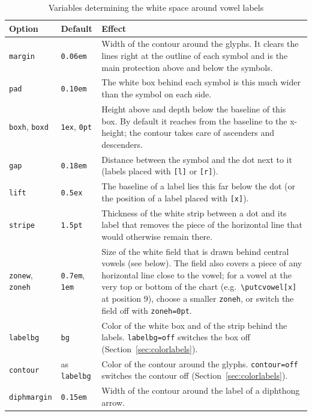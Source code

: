 \documentclass[a4paper,11pt]{article}
\newcommand\cmd[1]{\texttt{\textbackslash #1}}
\newcommand\opt[1]{\texttt{#1}}
\begin{document}
\begin{table}[htbp]
	\begin{center}\small
		\renewcommand\arraystretch{1.2}
		\begin{tabular}{@{}llp{12cm}@{}}
			\toprule
			Option & Default & Effect\\
			\midrule
			\opt{margin}     & \texttt{0.06em} & Width of the contour around the glyphs. It clears the lines
			right at the outline of each symbol and is the main protection above and below
			the symbols.\\
			\opt{pad}        & \texttt{0.10em} & The white box behind each symbol is this much wider than the
			symbol on each side.\\
			\opt{boxh}, \opt{boxd} & \texttt{1ex}, \texttt{0pt} & Height above and depth below the baseline of this
			box. By default it reaches from the baseline to the x-height; the contour
			takes care of ascenders and descenders.\\
			\opt{gap}        & \texttt{0.18em} & Distance between the symbol and the dot next to it
			(labels placed with \texttt{[l]} or \texttt{[r]}).\\
			\opt{lift}       & \texttt{0.5ex}   & The baseline of a label lies this far below the dot (or the
			position of a label placed with \texttt{[x]}).\\
			\opt{stripe}     & \texttt{1.5pt}  & Thickness of the white strip between a dot and its label that removes the piece of the horizontal line that would otherwise remain there.\\
			\opt{zonew}, \opt{zoneh} & \texttt{0.7em}, \texttt{1em} & Size of the white field that is drawn behind central vowels
			(see below). The field also covers a piece of any horizontal line close to the vowel; for a vowel at the very top or bottom of the chart (e.g.\ \cmd{putcvowel[x]} at position 9), choose a smaller \opt{zoneh}, or switch the field off with \texttt{zoneh=0pt}.\\
			\opt{labelbg} & \texttt{bg} & Color of the white box and of the strip behind the labels. \texttt{labelbg=off} switches the box off (Section~\ref{sec:colorlabels}).\\
			\opt{contour} & as \opt{labelbg} & Color of the contour around the glyphs. \texttt{contour=off} switches the contour off (Section~\ref{sec:colorlabels}).\\
			\opt{diphmargin} & \texttt{0.15em} & Width of the contour around the label of a diphthong arrow.\\
			\bottomrule
		\end{tabular}
	\end{center}
	\caption{Variables determining the white space around vowel labels}
	\label{tab:whitespace}
\end{table}
\end{document}
